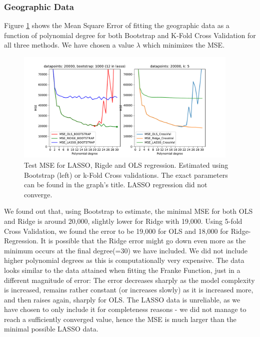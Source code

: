 \documentclass[11pt,a4paper,titlepage]{article}
\begin{document}
\subsubsection{Geographic Data}
Figure \ref{fig:MSE_Korea} shows the Mean Square Error of fitting the geographic data as a function of polynomial degree for both Bootstrap and K-Fold Cross Validation for all three methods. We have chosen a value $\lambda$ which minimizes the MSE. 
\begin{figure}[H]
\centering
\includegraphics[width=0.95\textwidth]{MSE_different_methods_Korea_LARGE.pdf}
\caption[Test MSE for LASSO, Rigde and OLS regression (geo, 20000 points)]{Test MSE for LASSO, Rigde and OLS regression. Estimated using Bootstrap (left) or k-Fold Cross validations. The exact parameters can be found in the graph's title. LASSO regression did not converge.}
\label{fig:MSE_Korea}
\end{figure}
We found out that, using Bootstrap to estimate, the minimal MSE for both OLS and Ridge is around 20,000, slightly lower for Ridge with 19,000. Using 5-fold Cross Validation, we found the error to be 19,000 for OLS and 18,000 for Ridge-Regression. It is possible that the Ridge error might go down even more as the minimum occurs at the final degree(=30) we have included. We did not include higher polynomial degrees as this is computationally very expensive. The data looks similar to the data attained when fitting the Franke Function, just in a different magnitude of error: The error decreases sharply as the model complexity is increased, remains rather constant (or increases slowly) as it is increased more, and then raises again, sharply for OLS. The LASSO data is unreliable, as we have chosen to only include it for completeness reasons - we did not manage to reach a sufficiently converged value, hence the MSE is much larger than the minimal possible LASSO data.\\
\end{document}
